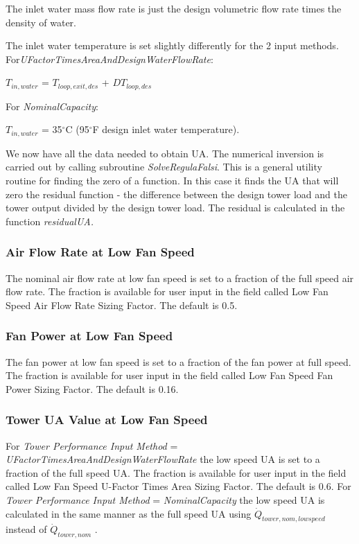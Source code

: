 The inlet water mass flow rate is just the design volumetric flow rate times the density of water.

The inlet water temperature is set slightly differently for the 2 input methods. For\emph{UFactorTimesAreaAndDesignWaterFlowRate}:

\(T_{in,water}\) = \(T_{loop,exit,des}\) + \(DT_{loop,des}\)

For \emph{NominalCapacity}:

\(T_{in,water}\) = 35\(^{\circ}\)C (95\(^{\circ}\)F design inlet water temperature).

We now have all the data needed to obtain UA. The numerical inversion is carried out by calling subroutine \emph{SolveRegulaFalsi}. This is a general utility routine for finding the zero of a function. In this case it finds the UA that will zero the residual function - the difference between the design tower load and the tower output divided by the design tower load. The residual is calculated in the function \emph{residualUA.}

\subsubsection{Air Flow Rate at Low Fan Speed}\label{air-flow-rate-at-low-fan-speed}

The nominal air flow rate at low fan speed is set to a fraction of the full speed air flow rate. The fraction is available for user input in the field called Low Fan Speed Air Flow Rate Sizing Factor. The default is 0.5.

\subsubsection{Fan Power at Low Fan Speed}\label{fan-power-at-low-fan-speed}

The fan power at low fan speed is set to a fraction of the fan power at full speed. The fraction is available for user input in the field called Low Fan Speed Fan Power Sizing Factor. The default is 0.16.

\subsubsection{Tower UA Value at Low Fan Speed}\label{tower-ua-value-at-low-fan-speed}

For \emph{Tower Performance Input Method} = \emph{UFactorTimesAreaAndDesignWaterFlowRate} the low speed UA is set to a fraction of the full speed UA. The fraction is available for user input in the field called Low Fan Speed U-Factor Times Area Sizing Factor. The default is 0.6. For \emph{Tower Performance Input Method} = \emph{NominalCapacity} the low speed UA is calculated in the same manner as the full speed UA using \(\dot Q_{tower,nom,lowspeed}\) instead of \(\dot Q_{tower,nom}\) .

